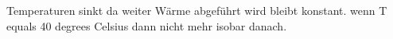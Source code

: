 Temperaturen sinkt da weiter Wärme abgeführt wird bleibt konstant. wenn T equals 40 degrees Celsius dann nicht mehr isobar danach.